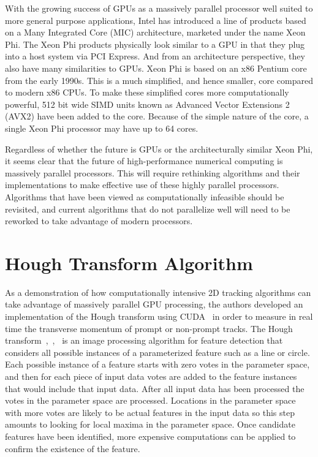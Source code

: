 \documentclass{JINST}
\begin{document}
With the growing success of GPUs as a massively parallel processor well suited to more general purpose applications, Intel has introduced a line of products based on a Many Integrated Core (MIC) architecture, marketed under the name Xeon Phi.  The Xeon Phi products physically look similar to a GPU in that they plug into a host system via PCI Express.  And from an architecture perspective, they also have many similarities to GPUs.  Xeon Phi is based on an x86 Pentium core from the early 1990s.  This is a much simplified, and hence smaller, core compared to modern x86 CPUs.  To make these simplified cores more computationally powerful, 512 bit wide SIMD units known as Advanced Vector Extensions 2 (AVX2) have been added to the core.  Because of the simple nature of the core, a single Xeon Phi processor may have up to 64 cores.

Regardless of whether the future is GPUs or the architecturally similar Xeon Phi, it seems clear that the future of high-performance numerical computing is massively parallel processors.  This will require rethinking algorithms and their implementations to make effective use of these highly parallel processors.  Algorithms that have been viewed as computationally infeasible should be revisited, and current algorithms that do not parallelize well will need to be reworked to take advantage of modern processors.

\section{Hough Transform Algorithm}

As a demonstration of how computationally intensive 2D tracking algorithms can take advantage of massively parallel GPU processing, the authors developed an implementation of the Hough transform using CUDA~\cite{Halyo:2013} in order to measure in real time the transverse momentum of prompt or non-prompt tracks.  The Hough transform~\cite{bib:HT1},~\cite{bib:HT2},~\cite{bib:HT3} is an image processing algorithm for feature detection that considers all possible instances of a parameterized feature such as a line or circle.  Each possible instance of a feature starts with zero votes in the parameter space, and then for each piece of input data votes are added to the feature instances that would include that input data.  After all input data has been processed the votes in the parameter space are processed.  Locations in the parameter space with more votes are likely to be actual features in the input data so this step amounts to looking for local maxima in the parameter space.  Once candidate features have been identified, more expensive computations can be applied to confirm the existence of the feature.
\end{document}
